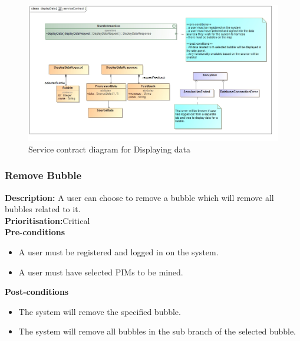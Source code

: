 \documentclass[hidelinks,english]{article}
\begin{document}
    			\begin{figure}[!h]
    			\includegraphics[width=\linewidth]{serviceContractDisplayData.jpg}
    			\caption{Service contract diagram for Displaying data}
    			\label{ServiceContractDisplayData}
    			\end{figure}
				
    		\subsubsection{Remove Bubble}
				\textbf{Description:}  A user can choose to remove a bubble which will remove all bubbles related to it.\\
			    \textbf{Prioritisation:}Critical\\
     			\textbf{Pre-conditions}
				\begin{itemize}
					\item A user must be registered and logged in on the system.
					\item A user must have selected PIMs to be mined.
				\end{itemize}
    			\textbf{Post-conditions}
     			\begin{itemize}
			        \item The system will remove the specified bubble.
			        \item The system will remove all bubbles in the sub branch of the selected bubble.
    			\end{itemize}
    			
\end{document}
